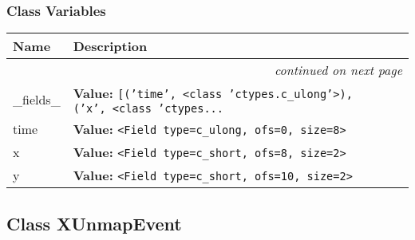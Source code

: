 
  \subsubsection{Class Variables}

    \vspace{-1cm}
\hspace{\varindent}\begin{longtable}{|p{\varnamewidth}|p{\vardescrwidth}|l}
\cline{1-2}
\cline{1-2} \centering \textbf{Name} & \centering \textbf{Description}& \\
\cline{1-2}
\endhead\cline{1-2}\multicolumn{3}{r}{\small\textit{continued on next page}}\\\endfoot\cline{1-2}
\endlastfoot\raggedright \_\-f\-i\-e\-l\-d\-s\-\_\- & \raggedright \textbf{Value:} 
{\tt \texttt{[}\texttt{(}\texttt{'}\texttt{time}\texttt{'}\texttt{, }{\textless}class 'ctypes.c\_ulong'{\textgreater}\texttt{)}\texttt{, }\texttt{(}\texttt{'}\texttt{x}\texttt{'}\texttt{, }{\textless}class 'ctypes\texttt{...}}&\\
\cline{1-2}
\raggedright t\-i\-m\-e\- & \raggedright \textbf{Value:} 
{\tt {\textless}Field type=c\_ulong, ofs=0, size=8{\textgreater}}&\\
\cline{1-2}
\raggedright x\- & \raggedright \textbf{Value:} 
{\tt {\textless}Field type=c\_short, ofs=8, size=2{\textgreater}}&\\
\cline{1-2}
\raggedright y\- & \raggedright \textbf{Value:} 
{\tt {\textless}Field type=c\_short, ofs=10, size=2{\textgreater}}&\\
\cline{1-2}
\end{longtable}



\subsection{Class XUnmapEvent}

